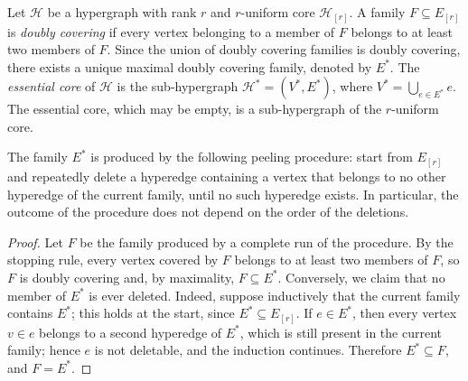 \documentclass[12pt,reqno]{amsart}
\begin{document}
\begin{definition}\label{def:essential_core}
Let $\mathcal{H}$ be a hypergraph with rank $r$ and $r$-uniform core $\mathcal{H}_{[r]}$. A family $F \subseteq E_{[r]}$ is \textit{doubly covering} if every vertex belonging to a member of $F$ belongs to at least two members of $F$. Since the union of doubly covering families is doubly covering, there exists a unique maximal doubly covering family, denoted by $E^*$. The \textit{essential core} of $\mathcal{H}$ is the sub-hypergraph $\mathcal{H}^* = (V^*, E^*)$, where $V^* = \bigcup_{e \in E^*} e$. The essential core, which may be empty, is a sub-hypergraph of the $r$-uniform core.
\end{definition}

\begin{lemma}\label{lem:peeling}
The family $E^*$ is produced by the following peeling procedure: start from $E_{[r]}$ and repeatedly delete a hyperedge containing a vertex that belongs to no other hyperedge of the current family, until no such hyperedge exists. In particular, the outcome of the procedure does not depend on the order of the deletions.
\end{lemma}
\begin{proof}
Let $F$ be the family produced by a complete run of the procedure. By the stopping rule, every vertex covered by $F$ belongs to at least two members of $F$, so $F$ is doubly covering and, by maximality, $F \subseteq E^*$. Conversely, we claim that no member of $E^*$ is ever deleted. Indeed, suppose inductively that the current family contains $E^*$; this holds at the start, since $E^* \subseteq E_{[r]}$. If $e \in E^*$, then every vertex $v \in e$ belongs to a second hyperedge of $E^*$, which is still present in the current family; hence $e$ is not deletable, and the induction continues. Therefore $E^* \subseteq F$, and $F = E^*$.
\end{proof}
\end{document}
